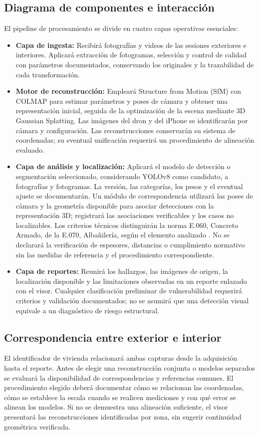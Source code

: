 \documentclass[12pt,oneside]{report}
\begin{document}
\subsection{Diagrama de componentes e interacción}
El pipeline de procesamiento se divide en cuatro capas operativas esenciales:
\begin{itemize}
    \item \textbf{Capa de ingesta:} Recibirá fotografías y videos de las sesiones exteriores e interiores. Aplicará extracción de fotogramas, selección y control de calidad con parámetros documentados, conservando los originales y la trazabilidad de cada transformación.
    \item \textbf{Motor de reconstrucción:} Empleará Structure from Motion (SfM) con COLMAP para estimar parámetros y poses de cámara y obtener una representación inicial, seguida de la optimización de la escena mediante 3D Gaussian Splatting. Las imágenes del dron y del iPhone se identificarán por cámara y configuración. Las reconstrucciones conservarán su sistema de coordenadas; su eventual unificación requerirá un procedimiento de alineación evaluado.
    \item \textbf{Capa de análisis y localización:} Aplicará el modelo de detección o segmentación seleccionado, considerando YOLOv8 como candidato, a fotografías y fotogramas. La versión, las categorías, los pesos y el eventual ajuste se documentarán. Un módulo de correspondencia utilizará las poses de cámara y la geometría disponible para asociar detecciones con la representación 3D; registrará las asociaciones verificables y los casos no localizables. Los criterios técnicos distinguirán la norma E.060, Concreto Armado, de la E.070, Albañilería, según el elemento analizado \citep{rneportal}. No se declarará la verificación de espesores, distancias o cumplimiento normativo sin las medidas de referencia y el procedimiento correspondiente.
    \item \textbf{Capa de reportes:} Reunirá los hallazgos, las imágenes de origen, la localización disponible y las limitaciones observadas en un reporte enlazado con el visor. Cualquier clasificación preliminar de vulnerabilidad requerirá criterios y validación documentados; no se asumirá que una detección visual equivale a un diagnóstico de riesgo estructural.
\end{itemize}

\subsection{Correspondencia entre exterior e interior}
El identificador de vivienda relacionará ambas capturas desde la adquisición hasta el reporte. Antes de elegir una reconstrucción conjunta o modelos separados se evaluará la disponibilidad de correspondencias y referencias comunes. El procedimiento elegido deberá documentar cómo se relacionan las coordenadas, cómo se establece la escala cuando se realicen mediciones y con qué error se alinean los modelos. Si no se demuestra una alineación suficiente, el visor presentará las reconstrucciones identificadas por zona, sin sugerir continuidad geométrica verificada.
\end{document}
